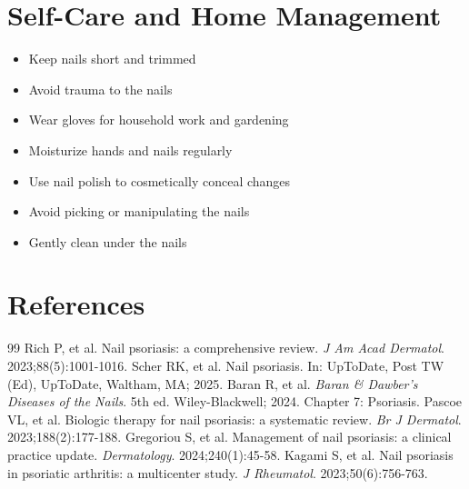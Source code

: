 \section*{Self-Care and Home Management}
\begin{itemize}
\item Keep nails short and trimmed
\item Avoid trauma to the nails
\item Wear gloves for household work and gardening
\item Moisturize hands and nails regularly
\item Use nail polish to cosmetically conceal changes
\item Avoid picking or manipulating the nails
\item Gently clean under the nails
\end{itemize}

\section*{References}

\begin{thebibliography}{99}
 Rich P, et al. Nail psoriasis: a comprehensive review. \emph{J Am Acad Dermatol}. 2023;88(5):1001-1016.
 Scher RK, et al. Nail psoriasis. In: UpToDate, Post TW (Ed), UpToDate, Waltham, MA; 2025.
 Baran R, et al. \emph{Baran \& Dawber's Diseases of the Nails}. 5th ed. Wiley-Blackwell; 2024. Chapter 7: Psoriasis.
 Pascoe VL, et al. Biologic therapy for nail psoriasis: a systematic review. \emph{Br J Dermatol}. 2023;188(2):177-188.
 Gregoriou S, et al. Management of nail psoriasis: a clinical practice update. \emph{Dermatology}. 2024;240(1):45-58.
 Kagami S, et al. Nail psoriasis in psoriatic arthritis: a multicenter study. \emph{J Rheumatol}. 2023;50(6):756-763.
\end{thebibliography}
